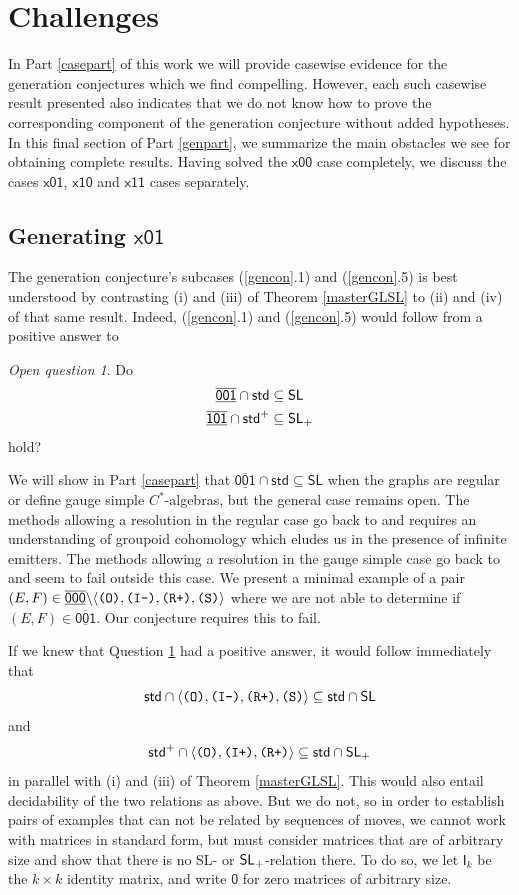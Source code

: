 \documentclass[12pt]{amsbook}%
\theoremstyle{defin}
\theoremstyle{remark}
\newtheorem{openq}[theor]{Open question}
\numberwithin{equation}{chapter}
\numberwithin{theor}{section}
\newcommand{\xyz}[1]{\mbox{$\mathsf{#1}$}}
\newcommand{\xyzrel}[1]{\mbox{$\overline{\underline{\mathsf{ #1}}}$}}
\newcommand{\IIIm}{\mbox{\texttt{\textup{(I-)}}}}
\newcommand{\IIIp}{\mbox{\texttt{\textup{(I+)}}}}
\newcommand{\OOO}{\mbox{\texttt{\textup{(O)}}}}
\newcommand{\RRRp}{\mbox{\texttt{\textup{(R+)}}}}
\newcommand{\SSS}{\mbox{\texttt{\textup{(S)}}}}
\newcommand{\idmatrix}{\mathsf{I}}
\newcommand{\zmatrix}{\mathsf{0}}
\newcommand{\standard}{\mathsf{std}}
\newcommand{\standardp}{\mathsf{std}^+}
\newcommand{\SLrel}{\mathsf{SL}}
\newcommand{\SL}{{\sf SL}}
\newcommand{\SLp}{\mbox{${\sf SL}_+$}}
\begin{document}
\section{Challenges}

In Part \ref{casepart} of this work we will provide casewise evidence for the generation conjectures which we find compelling. However, each such casewise result presented also indicates that we do not know how to prove the corresponding component of the generation conjecture without added hypotheses. In this final section of Part \ref{genpart}, we summarize the main obstacles we see for obtaining complete results. Having solved the \xyz{x00} case completely, we discuss the cases \xyz{x01}, \xyz{x10} and \xyz{x11} cases separately.

\subsection{Generating  \xyz{x01}}

The generation conjecture's subcases (\ref{gencon}.1) and (\ref{gencon}.5) is best understood by contrasting (i) and (iii) of Theorem \ref{masterGLSL} to (ii) and (iv) of that same result. Indeed, (\ref{gencon}.1) and (\ref{gencon}.5)  would follow from a positive answer to 


\begin{openq}\label{SLconj}
Do
\begin{gather*}
\xyzrel{001}\cap \standard \subseteq \SL\\
\xyzrel{101}\cap \standardp \subseteq \SLp
\end{gather*}
hold?
\end{openq}


We will show in Part \ref{casepart} that $\xyzrel{001}\cap \standard\subseteq \SLrel$ when the graphs are regular or define gauge simple $C^*$-algebras, but the general case remains open. The methods allowing a resolution in the regular case go back to \cite{kmhm:coetmscka} and requires an understanding of groupoid cohomology which eludes us in the presence of infinite emitters. The methods allowing a resolution in the gauge simple case go back to \cite{apws:gcsga} and seem to fail outside this case. We present a minimal example of a pair $(E,F)\in \xyzrel{000}\backslash \langle\OOO,\IIIm,\RRRp,\SSS\rangle$ where we are not able to determine if $(E,F)\in \xyzrel{001}$. Our conjecture requires this to fail.


If we knew that Question \ref{SLconj} had a positive answer, it would follow immediately that
\[
\standard\cap \langle \OOO,\IIIm,\RRRp,\SSS\rangle\subseteq \standard\cap\SL
\]
and
\[
\standardp\cap \langle \OOO,\IIIp,\RRRp\rangle\subseteq \standard\cap\SLp
\]
in parallel with (i) and (iii) of Theorem \ref{masterGLSL}. This would also entail decidability of the two relations as above.
But we do not, so in order to establish pairs of examples that can not be related by sequences of moves, we cannot work with matrices in standard form, but must consider matrices that are of arbitrary size and show that there is no \SL- or \SLp-relation there. To do so, we let  $\idmatrix_k$ be the $k\times k$ identity matrix, and write $\zmatrix$ for zero matrices of arbitrary size.
\end{document}
